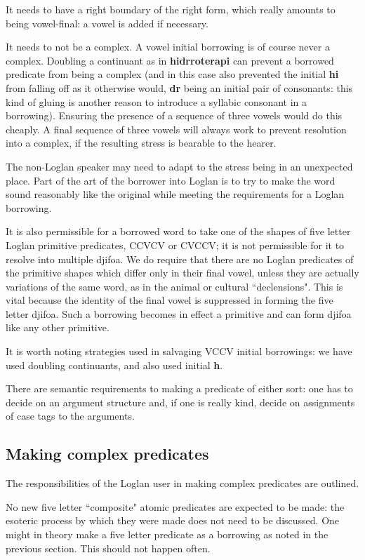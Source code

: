 \documentclass[12pt]{book}
\begin{document}
{It needs to have a right boundary of the right form, which really amounts to being vowel-final:  a vowel is added if necessary.

It needs to not be a complex.  A vowel initial borrowing is of course never a complex.  Doubling a continuant as in {\bf hidrroterapi} can prevent a borrowed predicate from being a complex (and in this case also prevented the initial {\bf hi} from falling off as it otherwise would, {\bf dr} being an initial pair of consonants:  this kind of gluing is another reason to introduce a syllabic consonant in a borrowing).  Ensuring the presence of a sequence of three vowels would  do this cheaply.  A final sequence of three vowels will always work to prevent resolution into a complex, if the resulting stress is bearable to the hearer.

The non-Loglan speaker may need to adapt to the stress being in an unexpected place.  Part of the art of the borrower into Loglan is to try to make the word sound reasonably like the original while meeting the requirements for a Loglan borrowing.

It is also permissible for a borrowed word to take one of the shapes of five letter Loglan primitive predicates, CCVCV or CVCCV; it is not permissible for it to resolve into multiple djifoa.  We do require that there are no Loglan predicates of the primitive shapes which differ only in their final vowel, unless they are actually variations of the same word, as in the animal or cultural ``declensions".  This is vital because the identity of the final vowel is suppressed in forming the five letter djifoa.  Such a borrowing becomes in effect a primitive and can form djifoa like any other primitive.

It is worth noting strategies used in salvaging VCCV initial borrowings:  we have used doubling continuants, and also used initial {\bf h}.

There are semantic requirements to making a predicate of either sort:  one has to decide on an argument structure and, if one is really kind, decide on assignments of case tags to the arguments.

\subsection{Making complex predicates}

The responsibilities of the Loglan user in making complex predicates are outlined.

No new five letter ``composite" atomic predicates are expected to be made:  the esoteric process by which they were made does not need to be discussed.  One might in theory make a five letter predicate
as a borrowing as noted in the previous section.  This should not happen often.

}
\end{document}

